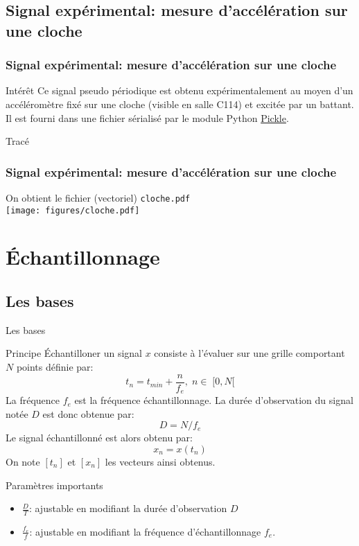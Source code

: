 \documentclass[8pt,a4paper]{beamer}
\begin{document}
  \subsection{Signal expérimental: mesure d'accélération sur une cloche}
  \begin{frame}[containsverbatim]
  \frametitle{Signal expérimental: mesure d'accélération sur une cloche}
  \begin{block}{Intérêt}
  Ce signal pseudo périodique est obtenu expérimentalement au moyen d'un accéléromètre fixé sur une cloche (visible en salle C114) et excitée par un battant. Il est fourni dans une fichier sérialisé par le module Python \href{http://docs.python.org/library/pickle.html}{Pickle}.  
  \end{block}
  \begin{block}{Tracé}
  
  \end{block}
  \end{frame}
  \begin{frame}[containsverbatim]
  \frametitle{Signal expérimental: mesure d'accélération sur une cloche}
  On obtient le fichier (vectoriel) \lstinline!cloche.pdf!\\  
  \texttt{[image: figures/cloche.pdf]}
  \end{frame}

\section{Échantillonnage}
  \subsection{Les bases}
  \begin{frame}{Les bases}
  \begin{block}{Principe}
  \'Echantilloner un signal $x$ consiste à l'évaluer sur une grille comportant $N$ points définie par:
  $$
  t_n = t_{min}+\frac{n}{f_e}, \; n \in \; [0,N[
  $$
  La fréquence $f_e$ est la fréquence échantillonnage. La durée d'observation du signal notée $D$ est donc obtenue par:
  $$
  D = N/f_e
  $$
  Le signal échantillonné est alors obtenu par:
  $$
  x_n=x(t_n)
  $$
  On note $[t_n]$ et $[x_n]$ les vecteurs ainsi obtenus.
  \end{block}
  \begin{block}{Paramètres importants}  
  \begin{itemize}
  \item $\frac{D}{T}$: ajustable en modifiant la durée d'observation $D$
  \item $\frac{f_e}{f}$: ajustable en modifiant la fréquence d’échantillonnage $f_e$.
  \end{itemize}
  \end{block}
  \end{frame}
  
\end{document}
